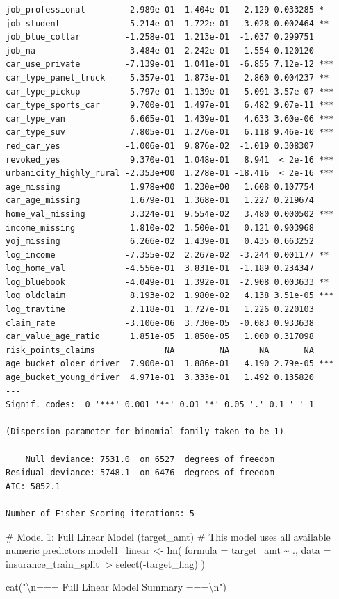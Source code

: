 \documentclass[
  11pt]{article}
\newenvironment{Shaded}{\begin{snugshade}}{\end{snugshade}}
\newcommand{\AttributeTok}[1]{\textcolor[rgb]{0.40,0.45,0.13}{#1}}
\newcommand{\CommentTok}[1]{\textcolor[rgb]{0.37,0.37,0.37}{#1}}
\newcommand{\FunctionTok}[1]{\textcolor[rgb]{0.28,0.35,0.67}{#1}}
\newcommand{\NormalTok}[1]{\textcolor[rgb]{0.00,0.23,0.31}{#1}}
\newcommand{\OtherTok}[1]{\textcolor[rgb]{0.00,0.23,0.31}{#1}}
\newcommand{\SpecialCharTok}[1]{\textcolor[rgb]{0.37,0.37,0.37}{#1}}
\newcommand{\StringTok}[1]{\textcolor[rgb]{0.13,0.47,0.30}{#1}}
\begin{document}
\begin{verbatim}
job_professional        -2.989e-01  1.404e-01  -2.129 0.033285 *  
job_student             -5.214e-01  1.722e-01  -3.028 0.002464 ** 
job_blue_collar         -1.258e-01  1.213e-01  -1.037 0.299751    
job_na                  -3.484e-01  2.242e-01  -1.554 0.120120    
car_use_private         -7.139e-01  1.041e-01  -6.855 7.12e-12 ***
car_type_panel_truck     5.357e-01  1.873e-01   2.860 0.004237 ** 
car_type_pickup          5.797e-01  1.139e-01   5.091 3.57e-07 ***
car_type_sports_car      9.700e-01  1.497e-01   6.482 9.07e-11 ***
car_type_van             6.665e-01  1.439e-01   4.633 3.60e-06 ***
car_type_suv             7.805e-01  1.276e-01   6.118 9.46e-10 ***
red_car_yes             -1.006e-01  9.876e-02  -1.019 0.308307    
revoked_yes              9.370e-01  1.048e-01   8.941  < 2e-16 ***
urbanicity_highly_rural -2.353e+00  1.278e-01 -18.416  < 2e-16 ***
age_missing              1.978e+00  1.230e+00   1.608 0.107754    
car_age_missing          1.679e-01  1.368e-01   1.227 0.219674    
home_val_missing         3.324e-01  9.554e-02   3.480 0.000502 ***
income_missing           1.810e-02  1.500e-01   0.121 0.903968    
yoj_missing              6.266e-02  1.439e-01   0.435 0.663252    
log_income              -7.355e-02  2.267e-02  -3.244 0.001177 ** 
log_home_val            -4.556e-01  3.831e-01  -1.189 0.234347    
log_bluebook            -4.049e-01  1.392e-01  -2.908 0.003633 ** 
log_oldclaim             8.193e-02  1.980e-02   4.138 3.51e-05 ***
log_travtime             2.118e-01  1.727e-01   1.226 0.220103    
claim_rate              -3.106e-06  3.730e-05  -0.083 0.933638    
car_value_age_ratio      1.851e-05  1.850e-05   1.000 0.317098    
risk_points_claims              NA         NA      NA       NA    
age_bucket_older_driver  7.900e-01  1.886e-01   4.190 2.79e-05 ***
age_bucket_young_driver  4.971e-01  3.333e-01   1.492 0.135820    
---
Signif. codes:  0 '***' 0.001 '**' 0.01 '*' 0.05 '.' 0.1 ' ' 1

(Dispersion parameter for binomial family taken to be 1)

    Null deviance: 7531.0  on 6527  degrees of freedom
Residual deviance: 5748.1  on 6476  degrees of freedom
AIC: 5852.1

Number of Fisher Scoring iterations: 5
\end{verbatim}

\begin{Shaded}
\begin{Highlighting}[]
\CommentTok{\# Model 1: Full Linear Model (target\_amt)}
\CommentTok{\# This model uses all available numeric predictors}
\NormalTok{model1\_linear }\OtherTok{\textless{}{-}} \FunctionTok{lm}\NormalTok{(}
    \AttributeTok{formula =}\NormalTok{ target\_amt }\SpecialCharTok{\textasciitilde{}}\NormalTok{ .,}
    \AttributeTok{data =}\NormalTok{ insurance\_train\_split }\SpecialCharTok{|\textgreater{}} \FunctionTok{select}\NormalTok{(}\SpecialCharTok{{-}}\NormalTok{target\_flag)}
\NormalTok{)}

\FunctionTok{cat}\NormalTok{(}\StringTok{"}\SpecialCharTok{\textbackslash{}n}\StringTok{=== Full Linear Model Summary ===}\SpecialCharTok{\textbackslash{}n}\StringTok{"}\NormalTok{)}
\end{Highlighting}
\end{Shaded}
\end{document}

